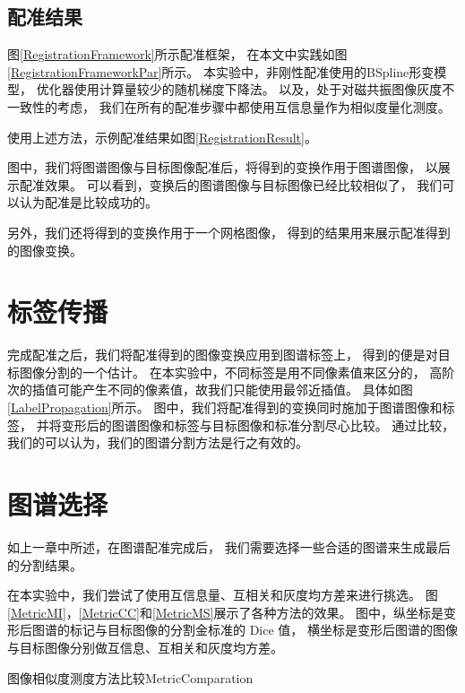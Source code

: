 \subsection{配准结果}
图\ref{RegistrationFramework}所示配准框架，
在本文中实践如图\ref{RegistrationFrameworkPar}所示。
本实验中，非刚性配准使用的BSpline形变模型，
优化器使用计算量较少的随机梯度下降法。
以及，处于对磁共振图像灰度不一致性的考虑，
我们在所有的配准步骤中都使用互信息量作为相似度量化测度。

使用上述方法，示例配准结果如图\ref{RegistrationResult}。

图中，我们将图谱图像与目标图像配准后，将得到的变换作用于图谱图像，
以展示配准效果。
可以看到，变换后的图谱图像与目标图像已经比较相似了，
我们可以认为配准是比较成功的。

另外，我们还将得到的变换作用于一个网格图像，
得到的结果用来展示配准得到的图像变换。




\section{标签传播}
完成配准之后，我们将配准得到的图像变换应用到图谱标签上，
得到的便是对目标图像分割的一个估计。
在本实验中，不同标签是用不同像素值来区分的，
高阶次的插值可能产生不同的像素值，故我们只能使用最邻近插值。
具体如图\ref{LabelPropagation}所示。
图中，我们将配准得到的变换同时施加于图谱图像和标签，
并将变形后的图谱图像和标签与目标图像和标准分割尽心比较。
通过比较，我们的可以认为，我们的图谱分割方法是行之有效的。



\section{图谱选择}
如上一章中所述，在图谱配准完成后，
我们需要选择一些合适的图谱来生成最后的分割结果。

在本实验中，我们尝试了使用互信息量、互相关和灰度均方差来进行挑选。
图\ref{MetricMI}，\ref{MetricCC}和\ref{MetricMS}展示了各种方法的效果。
图中，纵坐标是变形后图谱的标记与目标图像的分割金标准的 Dice 值，
横坐标是变形后图谱的图像与目标图像分别做互信息、互相关和灰度均方差。
\begin{pics}[htbp]{图像相似度测度方法比较}{MetricComparation}
\end{pics}

